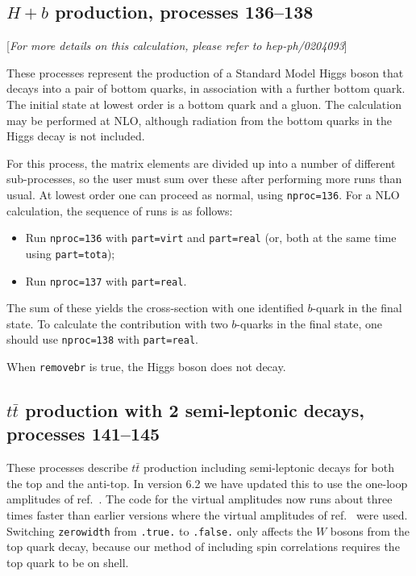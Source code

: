 \documentclass{article}
\begin{document}
{{{{{{\subsection{$H+b$ production, processes 136--138}
\label{subsec:Hb}

\begin{center}
[{\it For more details on this calculation, please refer to hep-ph/0204093}]
\end{center}

These processes represent the production of a Standard Model Higgs
boson that decays into a pair of bottom quarks,
in association with a further bottom quark. The initial state at lowest order
is a bottom quark and a gluon.
The calculation may be performed at NLO, although radiation from the
bottom quarks in the Higgs decay is not included.

For this process, the matrix elements are divided up into a number of
different sub-processes, so the user must sum over these after performing
more runs than usual. At lowest order one can proceed as normal, using
{\tt nproc=136}. For a NLO calculation, the sequence of runs is as follows:
\begin{itemize}
\item Run {\tt nproc=136} with {\tt part=virt} and {\tt part=real} (or, both
at the same time using {\tt part=tota});
\item Run {\tt nproc=137} with {\tt part=real}.
\end{itemize}
The sum of these yields the cross-section with one identified $b$-quark in
the final state. To calculate the contribution with two $b$-quarks in the
final state, one should use {\tt nproc=138} with {\tt part=real}.

When {\tt removebr} is true, the Higgs boson does not decay.

\subsection{$t\bar{t}$ production with 2 semi-leptonic decays, processes 141--145}
\label{subsec:ttbar}

These processes describe $t \bar{t}$ production including semi-leptonic
decays for both the top and the anti-top. 
In version 6.2 we have updated this to use the one-loop amplitudes of
ref.~\cite{Badger:2011yu}. The code for the virtual amplitudes now runs
about three times faster than earlier versions where the virtual
amplitudes of ref.~\cite{Korner:2002hy} were used.  
Switching {\tt zerowidth} from {\tt .true.} to {\tt .false.} only affects 
the $W$ bosons from the top quark decay, because our method of including spin
correlations requires the top quark to be on shell.

}}}}}}
\end{document}
